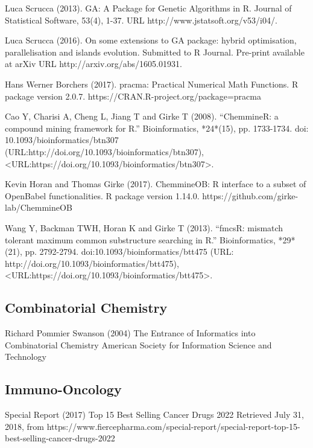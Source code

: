 Luca Scrucca (2013). 
\newblock GA: A Package for Genetic Algorithms in R. 
\newblock Journal of Statistical Software, 53(4), 1-37. URL http://www.jstatsoft.org/v53/i04/.

Luca Scrucca (2016). 
\newblock On some extensions to GA package: hybrid optimisation, parallelisation and islands evolution. Submitted to R Journal. 
\newblock Pre-print available at arXiv URL http://arxiv.org/abs/1605.01931.

Hans Werner Borchers (2017). 
\newblock pracma: Practical Numerical Math Functions. 
\newblock R package version 2.0.7. https://CRAN.R-project.org/package=pracma

Cao Y, Charisi A, Cheng L, Jiang T and Girke T (2008). 
\newblock “ChemmineR: a compound mining framework for R.”
\newblock Bioinformatics, *24*(15), pp. 1733-1734. doi: 10.1093/bioinformatics/btn307 (URL:http://doi.org/10.1093/bioinformatics/btn307), <URL:https://doi.org/10.1093/bioinformatics/btn307>.

Kevin Horan and Thomas Girke (2017). 
\newblock ChemmineOB: R interface to a subset of OpenBabel functionalities. 
\newblock R package version 1.14.0. https://github.com/girke-lab/ChemmineOB

 Wang Y, Backman TWH, Horan K and Girke T (2013). 
\newblock “fmcsR: mismatch tolerant maximum common substructure searching in R.” 
\newblock Bioinformatics, *29*(21), pp. 2792-2794. doi:10.1093/bioinformatics/btt475 (URL: http://doi.org/10.1093/bioinformatics/btt475), <URL:https://doi.org/10.1093/bioinformatics/btt475>.

\subsection{Combinatorial Chemistry}

Richard Pommier Swanson (2004)
\newblock The Entrance of Informatics into Combinatorial Chemistry
\newblock American Society for Information Science and Technology


\subsection{Immuno-Oncology}

Special Report (2017)
\newblock Top 15 Best Selling Cancer Drugs 2022
\newblock Retrieved July 31, 2018, from https://www.fiercepharma.com/special-report/special-report-top-15-best-selling-cancer-drugs-2022

